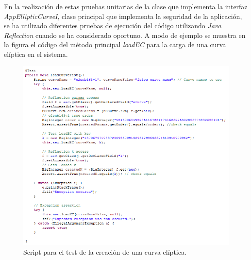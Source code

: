 \documentclass[../PFC.tex]{subfiles}
\begin{document}
En la realización de estas pruebas unitarias de la clase que implementa la interfaz \textit{AppEllipticCurveI}, clase principal que implementa la seguridad de la aplicación, se ha utilizado diferentes pruebas de ejecución del código utilizando \textit{Java Reflection}\cite{javaReflection} cuando se ha considerado oportuno. A modo de ejemplo se muestra en la figura el código del método principal \textit{loadEC} para la carga de una curva elíptica en el sistema.

\begin{figure}[H]
  \centering
  \includegraphics[width=1\textwidth]{./img/loadCurveTest}
  \caption{Script para el test de la creación de una curva elíptica.}
  \label{img:loadCurveTest}
\end{figure}
\end{document}
